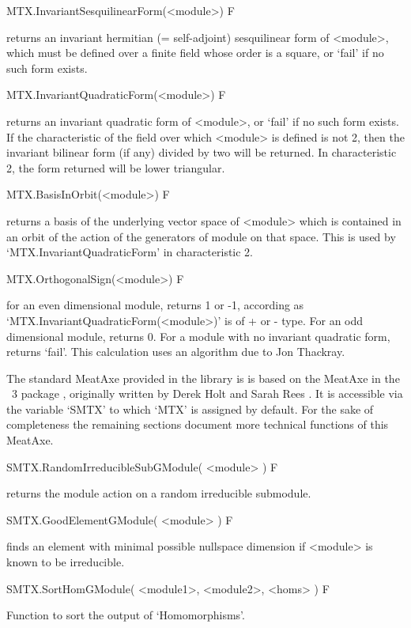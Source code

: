\>MTX.InvariantSesquilinearForm(<module>) F

returns an invariant hermitian (= self-adjoint) sesquilinear form of <module>,
which must be defined over a finite field whose order is a square,
or `fail' if no such form exists.

\>MTX.InvariantQuadraticForm(<module>) F

returns an invariant quadratic form of <module>,
or `fail' if no such form exists. If the characteristic of the field over
which <module> is defined is not 2, then the invariant bilinear form (if
any) divided by two will be returned. In characteristic 2, the form
returned will be lower triangular.

\>MTX.BasisInOrbit(<module>) F

returns a basis of the underlying vector space of <module> which is contained
in an orbit of the action of the generators of module on that space. This is
used by `MTX.InvariantQuadraticForm' in characteristic 2.

\>MTX.OrthogonalSign(<module>) F

for an even dimensional module, returns 1 or -1, according as
`MTX.InvariantQuadraticForm(<module>)' is of + or - type. For an odd
dimensional module, returns 0. For a module with no invariant
quadratic form, returns `fail'. This calculation uses an algorithm due
to Jon Thackray.


The standard MeatAxe provided in the {\GAP} library is
is based on the MeatAxe in the {\GAP}~3 package ,
originally written by Derek Holt and Sarah Rees \cite{HR94}. It is
accessible via the variable `SMTX' to which `MTX' is assigned by default. 
For the sake of completeness the remaining sections document more technical
functions of this MeatAxe.

\>SMTX.RandomIrreducibleSubGModule( <module> ) F

returns the module action on a random irreducible submodule.

\>SMTX.GoodElementGModule( <module> ) F

finds an element with minimal possible nullspace dimension if <module>
is known to be irreducible.

\>SMTX.SortHomGModule( <module1>, <module2>, <homs> ) F

Function to sort the output of `Homomorphisms'.

